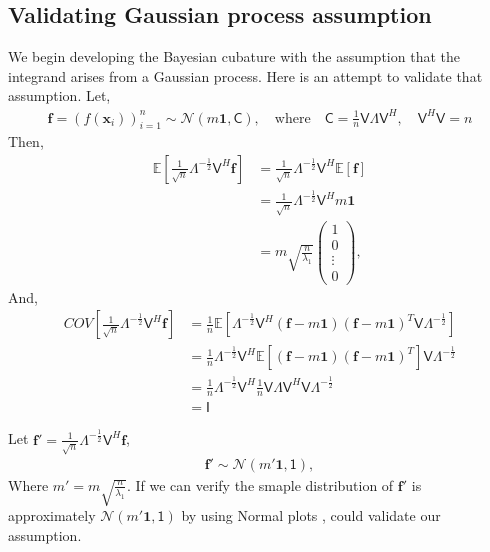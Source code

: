 \documentclass[smallextended]{svjour3}       %
\newcommand{\bm}[1]{\boldsymbol{#1}}
\newcommand{\vf}{\bm{f}}
\newcommand{\vx}{\bm{x}}
\newcommand{\vone}{\bm{1}}
\newcommand{\mC}{\mathsf{C}}
\newcommand{\mLambda}{\mathsf{\Lambda}}
\newcommand{\mV}{\mathsf{V}}
\begin{document}
\subsection{Validating Gaussian process assumption}


We begin developing the Bayesian cubature with the assumption that the integrand arises from a Gaussian process. Here is an attempt to validate that assumption. Let,
\begin{align*}
\vf = \left( f(\vx_i) \right)_{i=1}^n
\sim \mathcal{N} \left( m\vone, \mC \right), 
\quad \text{where}\quad \mC = \frac 1n \mV \mLambda \mV^H, \quad \mV^H \mV = n
\end{align*}
Then,
\begin{align*}
\mathbb{E}\left[ \frac{1}{\sqrt{n}} \mLambda^{-\frac 12} \mV^H \vf \right]
& =
\frac{1}{\sqrt{n}} \mLambda^{-\frac 12} \mV^H \mathbb{E}[\vf] 
\\
& =
\frac{1}{\sqrt{n}} \mLambda^{-\frac 12} \mV^H m \vone
\\
& = m \sqrt{\frac{n}{\lambda_1}} \left( 
\begin{array}{c}
1 \\ 0 \\ \vdots \\ 0
\end{array}
\right),
\end{align*}
And,
\begin{align*}
COV \left[ \frac{1}{\sqrt{n}} \mLambda^{-\frac 12} \mV^H \vf  \right]
&=
\frac{1}{n} \mathbb{E}\left[  
\mLambda^{-\frac 12} \mV^H (\vf - m \vone)
(\vf - m \vone)^T \mV \mLambda^{-\frac 12}
\right]
\\
&=
\frac{1}{n} \mLambda^{-\frac 12} \mV^H 
\mathbb{E}\left[ (\vf - m \vone)
(\vf - m \vone)^T \right] \mV \mLambda^{-\frac 12}
\\
&=
\frac{1}{n} \mLambda^{-\frac 12} \mV^H 
\frac 1n \mV \mLambda \mV^H \mV \mLambda^{-\frac 12}
\\
& = \mathsf{I}
\end{align*}

Let $\vf' = \frac{1}{\sqrt{n}} \mLambda^{-\frac 12} \mV^H \vf$,
\begin{align*}
\vf' \sim \mathcal{N} \left( 
m' \vone,
\mathsf{1}
\right),
\end{align*}
Where $m' = m \sqrt{\frac{n}{\lambda_1}} $.
If we can verify the smaple distribution of $\vf'$ is approximately $\mathcal{N}\left( m' \vone, \mathsf{1} \right)$ by using Normal plots , could validate our assumption.
\end{document}

